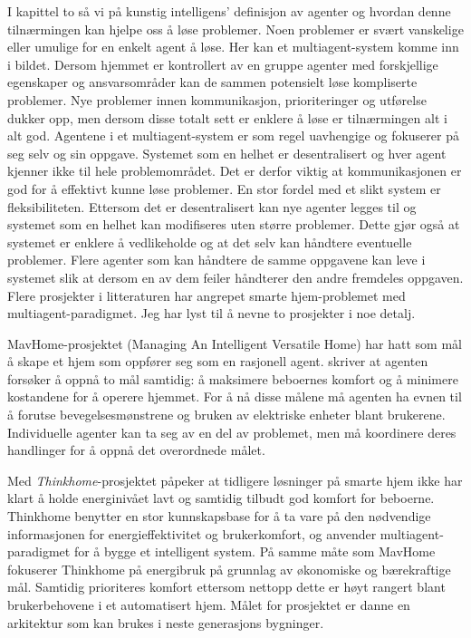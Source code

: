 I kapittel to så vi på kunstig intelligens' definisjon av agenter og hvordan denne tilnærmingen kan hjelpe oss å løse problemer. Noen problemer er svært vanskelige eller umulige for en enkelt agent å løse. Her kan et multiagent-system komme inn i bildet. Dersom hjemmet er kontrollert av en gruppe agenter med forskjellige egenskaper og ansvarsområder kan de sammen potensielt løse kompliserte problemer. Nye problemer innen kommunikasjon, prioriteringer og utførelse dukker opp, men dersom disse totalt sett er enklere å løse er tilnærmingen alt i alt god. Agentene i et multiagent-system er som regel uavhengige og fokuserer på seg selv og sin oppgave. Systemet som en helhet er desentralisert og hver agent kjenner ikke til hele problemområdet. Det er derfor viktig at kommunikasjonen er god for å effektivt kunne løse problemer. En stor fordel med et slikt system er fleksibiliteten. Ettersom det er desentralisert kan nye agenter legges til og systemet som en helhet kan modifiseres uten større problemer. Dette gjør også at systemet er enklere å vedlikeholde og at det selv kan håndtere eventuelle problemer. Flere agenter som kan håndtere de samme oppgavene kan leve i systemet slik at dersom en av dem feiler håndterer den andre fremdeles oppgaven. Flere prosjekter i litteraturen har angrepet smarte hjem-problemet med multiagent-paradigmet. Jeg har lyst til å nevne to prosjekter i noe detalj.

MavHome-prosjektet (Managing An Intelligent Versatile Home) har hatt som mål å skape et hjem som oppfører seg som en rasjonell agent. \citet{mavhome} skriver at agenten forsøker å oppnå to mål samtidig: å maksimere beboernes komfort og å minimere kostandene for å operere hjemmet. For å nå disse målene må agenten ha evnen til å forutse bevegelsesmønstrene og bruken av elektriske enheter blant brukerene. Individuelle agenter kan ta seg av en del av problemet, men må koordinere deres handlinger for å oppnå det overordnede målet.

Med \emph{Thinkhome}-prosjektet påpeker \citet{thinkhome} at tidligere løsninger på smarte hjem ikke har klart å holde energinivået lavt og samtidig tilbudt god komfort for beboerne. Thinkhome benytter en stor kunnskapsbase for å ta vare på den nødvendige informasjonen for energieffektivitet og brukerkomfort, og anvender multiagent-paradigmet for å bygge et intelligent system. På samme måte som MavHome fokuserer Thinkhome på energibruk på grunnlag av økonomiske og bærekraftige mål. Samtidig prioriteres komfort ettersom nettopp dette er høyt rangert blant brukerbehovene i et automatisert hjem. Målet for prosjektet er danne en arkitektur som kan brukes i neste generasjons bygninger.

